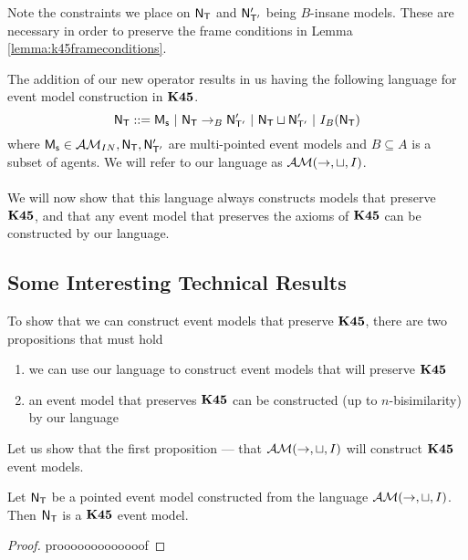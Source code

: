 Note the constraints we place on $\mathrm{\mathsf{N}}_\mathrm{\mathsf{T}}$ and $\mathrm{\mathsf{N}}'_{\mathrm{\mathsf{T}}'}$ being $B$-insane models.
These are necessary in order to preserve the frame conditions in Lemma
\ref{lemma:k45frameconditions}.

\newcommand{\EM}{\ensuremath{\eventClass}}

The addition of our new operator results in us having the following language for
event model construction in $\bf K45$.
\[
	\mathrm{\mathsf{N}}_\mathrm{\mathsf{T}} ::= \mathrm{\mathsf{M_s}} \text{ } | \text{ }\mathrm{\mathsf{N}}_\mathrm{\mathsf{T}} \to_B \mathrm{\mathsf{N}}'_{\mathrm{\mathsf{T}}'} \text{ }|
  \text{ } \mathrm{\mathsf{N}}_\mathrm{\mathsf{T}} \sqcup \mathrm{\mathsf{N}}'_{\mathrm{\mathsf{T}}'} \text{ } | \text{ } I_B(\mathrm{\mathsf{N}}_\mathrm{\mathsf{T}})
\]
where $\mathrm{\mathsf{M_s}} \in \mathcal{AM}_{IN}, \mathrm{\mathsf{N}}_\mathrm{\mathsf{T}}, \mathrm{\mathsf{N}}'_{\mathrm{\mathsf{T}}'}$ are multi-pointed event models and $B \subseteq
A$ is a subset of agents.
We will refer to our language as $\EM(\to,\sqcup,I)$. \\
\\
We will now show that this language always constructs models that preserve $\bf K45$, and that any
event model that preserves the axioms of $\bf K45$ can be constructed by our language.

\subsection{Some Interesting Technical Results}

To show that we can construct event models that preserve $\bf K45$, there are two propositions that
must hold
\begin{enumerate}
	\item we can use our language to construct event models that will preserve $\bf K45$
	\item an event model that preserves $\bf K45$ can be constructed (up to $n$-bisimilarity) by our
		language
\end{enumerate}

Let us show that the first proposition --- that $\EM(\to,\sqcup,I)$ will construct $\bf K45$ event
models.

\begin{lemma}
	Let $\mathrm{\mathsf{N}}_\mathrm{\mathsf{T}}$ be a pointed event model constructed from the language $\EM(\to,\sqcup,I)$.
	Then $\mathrm{\mathsf{N}}_\mathrm{\mathsf{T}}$ is a $\bf K45$ event model.
\end{lemma}
\begin{proof}
	\FIXME prooooooooooooof
\end{proof}


